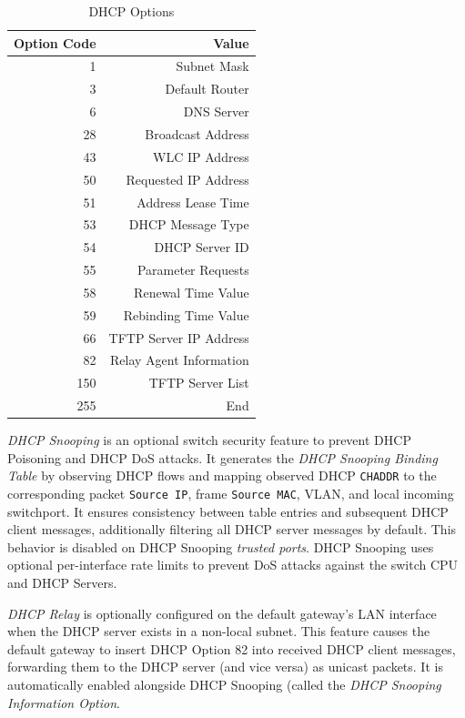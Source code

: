 \documentclass[12pt]{article}
\begin{document}
	\begin{table}[H]
	\centering
	\caption{DHCP Options \label{tab:DHCP OPTIONS}}
	\begin{tabular}{r | r}
	\hline
	\textbf{Option Code}	& \textbf{Value}\\\hline
	1				& Subnet Mask\\\hline
	3				& Default Router\\\hline
	6				& DNS Server\\\hline
	28				& Broadcast Address\\\hline
	43				& WLC IP Address\\\hline
	50				& Requested IP Address\\\hline
	51				& Address Lease Time\\\hline
	53				& DHCP Message Type\\\hline
	54				& DHCP Server ID\\\hline
	55				& Parameter Requests\\\hline
	58				& Renewal Time Value\\\hline
	59				& Rebinding Time Value\\\hline
	66				& TFTP Server IP Address\\\hline
	82				& Relay Agent Information\\\hline
	150				& TFTP Server List\\\hline
	255				& End\\\hline
	\end{tabular}\end{table}
	\textit{DHCP Snooping} is an optional switch security feature to prevent DHCP Poisoning and DHCP DoS attacks. It generates the \textit{DHCP Snooping Binding Table} by observing DHCP flows and mapping observed DHCP \texttt{CHADDR} to the corresponding packet \texttt{Source IP}, frame \texttt{Source MAC}, VLAN, and local incoming switchport. It ensures consistency between table entries and subsequent DHCP client messages, additionally filtering all DHCP server messages by default. This behavior is disabled on DHCP Snooping \textit{trusted ports}. DHCP Snooping uses optional per-interface rate limits to prevent DoS attacks against the switch CPU and DHCP Servers.

	\textit{DHCP Relay} is optionally configured on the default gateway's LAN interface when the DHCP server exists in a non-local subnet. This feature causes the default gateway to insert DHCP Option 82 into received DHCP client messages, forwarding them to the DHCP server (and vice versa) as unicast packets. It is automatically enabled alongside DHCP Snooping (called the \textit{DHCP Snooping Information Option}.
\end{document}
